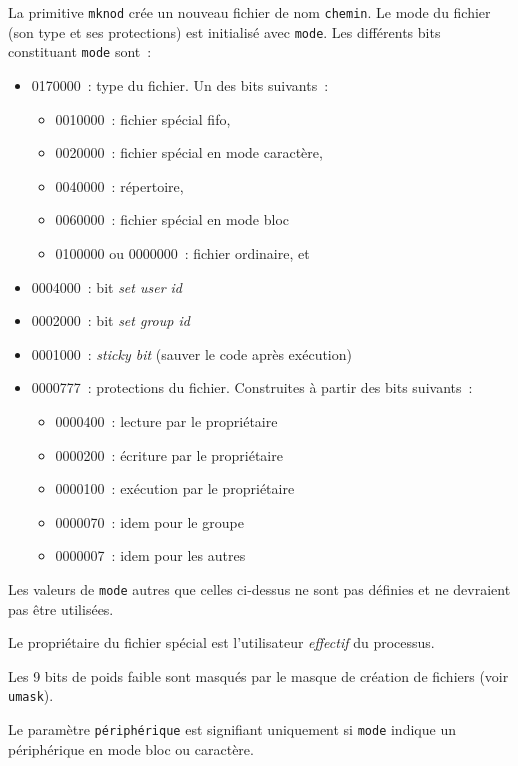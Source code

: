 \documentclass [twoside] {report}
\begin{document}
La primitive \texttt {mknod} crée un nouveau fichier de
nom \texttt {chemin}. Le mode du fichier (son type et ses
protections) est initialisé avec \texttt {mode}. Les
différents bits constituant \texttt {mode} sont~:

\begin {itemize}
    \item 0170000~: type du fichier. Un des bits suivants~:
	\begin {itemize}
	    \item 0010000~: fichier spécial fifo,
	    \item 0020000~: fichier spécial en mode caractère,
	    \item 0040000~: répertoire,
	    \item 0060000~: fichier spécial en mode bloc
	    \item 0100000 ou 0000000~: fichier ordinaire, et
	\end {itemize}
    \item 0004000~: bit \textit {set user id}
    \item 0002000~: bit \textit {set group id}
    \item 0001000~: \textit {sticky bit} (sauver le code après exécution)
    \item 0000777~: protections du fichier. Construites
	à partir des bits suivants~:
	\begin {itemize}
	    \item 0000400~: lecture par le propriétaire
	    \item 0000200~: écriture par le propriétaire
	    \item 0000100~: exécution par le propriétaire
	    \item 0000070~: idem pour le groupe
	    \item 0000007~: idem pour les autres
	\end {itemize}
\end {itemize}

Les valeurs de \texttt {mode} autres que celles
ci-dessus ne sont pas définies et ne devraient pas
être utilisées.

Le propriétaire du fichier spécial est
l'utilisateur \textit {effectif} du processus.

Les 9 bits de poids faible sont masqués par le
masque de création de fichiers (voir \texttt {umask}).

Le paramètre \texttt {périphérique} est signifiant
uniquement si \texttt {mode} indique un périphérique en
mode bloc ou caractère.
\end{document}
